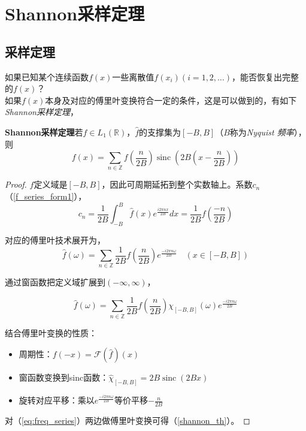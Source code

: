 \section{Shannon采样定理}

\subsection{采样定理}

如果已知某个连续函数$f(x)$一些离散值$f(x_i)(i=1,2,\dots)$，能否恢复出完整的$f(x)$？\\

如果$f(x)$本身及对应的傅里叶变换符合一定的条件，这是可以做到的，有如下\textit{Shannon采样定理}，

\begin{theorem}\label{th:discret_rep}
	\textbf{Shannon采样定理}\quad 若$f \in L_{1}(\mathbb{R})$，$\hat{f}$的支撑集为$[-B,B]$（$B$称为\textit{Nyquist 频率}），则
	\begin{equation}\label{shannon_th}
		f(x) = \sum_{n \in \mathbb{Z}} f\left(\frac{n}{2B}\right) \mathop{sinc}\left(2B\left(x-\frac{n}{2B}\right)\right)
	\end{equation}
\end{theorem}

\begin{proof}
	$\hat{f}$定义域是$[-B,B]$，因此可周期延拓到整个实数轴上。系数$c_n$（\ref{f_series_form1}），
	\[
		c_n = \frac{1}{2B} \int_{-B}^B \hat{f}(x) e^{\frac{i2\pi  n x}{2B}}dx = \frac{1}{2B}f\left(\frac{-n}{2B}\right)
	\]
	
	对应的傅里叶技术展开为，
	\begin{equation*}
		\hat{f}(\omega) = \sum_{n \in \mathbb{Z}}\frac{1}{2B}f\left(\frac{n}{2B}\right)e^{\frac{-i2\pi  n \omega}{2B}} \quad\left(x \in [-B,B]\right)
	\end{equation*}

	通过窗函数把定义域扩展到$(-\infty,\infty)$，
	
	\begin{equation}\label{eq:freq_series}
		\hat{f}(\omega) = \sum_{n \in \mathbb{Z}}\frac{1}{2B}f\left(\frac{n}{2B}\right)
		\chi_{[-B,B]}(\omega)
		e^{\frac{-i2\pi  n \omega}{2B}}
	\end{equation}

	结合傅里叶变换的性质：
	\begin{itemize}
		\item 周期性：$f(-x) = \mathcal{F}(\hat{f})(x)$
		\item 窗函数变换到sinc函数：$\hat{\chi}_{[-B,B]}= 2B\mathop{sinc}(2Bx)$
		\item 旋转对应平移：乘以$e^{\frac{-i2\pi  n \omega}{2B}}$等价平移$-\frac{n}{2B}$
	\end{itemize}

	对（\ref{eq:freq_series}）两边做傅里叶变换可得（\ref{shannon_th}）。
\end{proof}

